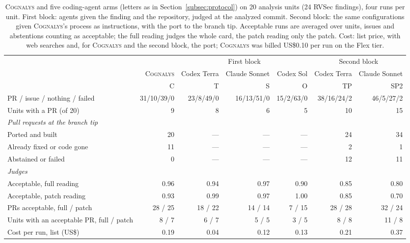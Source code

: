 \documentclass[conference]{IEEEtran}
\newcommand{\system}{\textsc{Cognalys}}
\begin{document}
\begin{table}[t]
\centering
\caption{\system{} and five coding-agent arms (letters as in
Section~\ref{subsec:protocol}) on 20 analysis units (24 RVSec findings), four runs per unit. First
block: agents given the finding and the repository, judged at the analyzed
commit. Second block: the same configurations given \system{}'s process as
instructions, with the port to the branch tip. Acceptable runs are averaged
over units, issues and abstentions counting as acceptable; the full reading
judges the whole card, the patch reading only the patch. Cost: list price,
with web searches and, for \system{} and the second block, the port; \system{}
was billed US\$0.10 per run on the Flex tier.}
\label{tab:optiona}
\footnotesize
\setlength{\tabcolsep}{4pt}
\begin{tabular}{p{4.2cm}r|rrr|rr}
\toprule
 & & \multicolumn{3}{c|}{First block} & \multicolumn{2}{c}{Second block} \\
 & \system{} & Codex Terra & Claude Sonnet & Codex Sol & Codex Terra & Claude Sonnet \\
 & C & T & S & O & TP & SP2 \\
\midrule
PR / issue / nothing / failed & 31/10/39/0 & 23/8/49/0 & 16/13/51/0 & 15/2/63/0 & 38/16/24/2 & 46/5/27/2 \\
Units with a PR (of 20) & 9 & 8 & 6 & 5 & 10 & 15 \\
\multicolumn{7}{l}{\emph{Pull requests at the branch tip}} \\
\quad Ported and built & 20 & --- & --- & --- & 24 & 34 \\
\quad Already fixed or code gone & 11 & --- & --- & --- & 2 & 1 \\
\quad Abstained or failed & 0 & --- & --- & --- & 12 & 11 \\
\multicolumn{7}{l}{\emph{Judges}} \\
\quad Acceptable, full reading & 0.96 & 0.94 & 0.97 & 0.90 & 0.85 & 0.80 \\
\quad Acceptable, patch reading & 0.93 & 0.99 & 0.97 & 1.00 & 0.85 & 0.70 \\
\quad PRs acceptable, full / patch & 28 / 25 & 18 / 22 & 14 / 14 & 7 / 15 & 28 / 28 & 32 / 24 \\
\quad Units with an acceptable PR, full / patch & 8 / 7 & 6 / 7 & 5 / 5 & 3 / 5 & 8 / 8 & 11 / 8 \\
Cost per run, list (US\$) & 0.19 & 0.04 & 0.12 & 0.13 & 0.21 & 0.37 \\
\bottomrule
\end{tabular}
\end{table}
\end{document}
